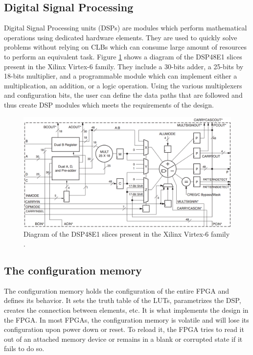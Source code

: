     \subsection{Digital Signal Processing}

      Digital Signal Processing units (DSPs) \cite{VIRTEX-DSP} are modules which perform mathematical operations using dedicated hardware elements. They are used to quickly solve problems without relying on CLBs which can consume large amount of resources to perform an equivalent task. Figure \ref{fig:II-6-dsp} shows a diagram of the DSP48E1 slices present in the Xilinx Virtex-6 family. They include a 30-bits adder, a 25-bits by 18-bits multiplier, and a programmable module which can implement either a multiplication, an addition, or a logic operation. Using the various multiplexers and configuration bits, the user can define the data paths that are followed and thus create DSP modules which meets the requirements of the design.

      \begin{figure}[h!]
        \centering
        \includegraphics[width=\textwidth]{img/II-6-irradiation/dsp.png}
        \caption{Diagram of the DSP48E1 slices present in the Xilinx Virtex-6 family \cite{VIRTEX-DSP}.}
        \label{fig:II-6-dsp}
      \end{figure}

    \subsection{The configuration memory}

      The configuration memory holds the configuration of the entire FPGA and defines its behavior. It sets the truth table of the LUTs, parametrizes the DSP, creates the connection between elements, etc. It is what implements the design in the FPGA. In most FPGAs, the configuration memory is volatile and will lose its configuration upon power down or reset. To reload it, the FPGA tries to read it out of an attached memory device or remains in a blank or corrupted state if it fails to do so.


